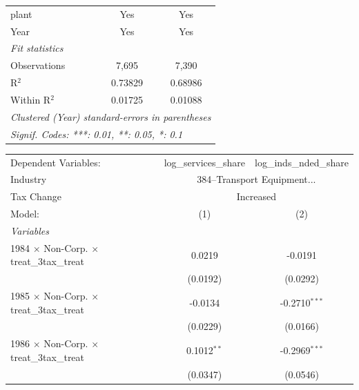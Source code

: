 \documentclass[
  12pt]{article}
\theoremstyle{definition}
\theoremstyle{remark}
\begin{document}
\begin{table}
\begin{minipage}{\linewidth}
\begin{tabular}{lcc}
   plant                                                   & Yes                    & Yes\\  
   Year                                                    & Yes                    & Yes\\  
   \midrule
   \emph{Fit statistics}\\
   Observations                                            & 7,695                  & 7,390\\  
   R$^2$                                                   & 0.73829                & 0.68986\\  
   Within R$^2$                                            & 0.01725                & 0.01088\\  
   \midrule \midrule
   \multicolumn{3}{l}{\emph{Clustered (Year) standard-errors in parentheses}}\\
   \multicolumn{3}{l}{\emph{Signif. Codes: ***: 0.01, **: 0.05, *: 0.1}}\\
\end{tabular}
\par\endgroup
\begingroup
\centering
\begin{tabular}{lcc}
   \tabularnewline \midrule \midrule
   Dependent Variables:                                    & log\_services\_share   & log\_inds\_nded\_share\\     
   Industry & \multicolumn{2}{c}{384–Transport Equipment...} \\ 
   Tax Change & \multicolumn{2}{c}{Increased} \\ 
   Model:                                                  & (1)                    & (2)\\  
   \midrule
   \emph{Variables}\\
   1984 $\times$ Non-Corp. $\times$ treat\_3tax\_treat     & 0.0219                 & -0.0191\\   
                                                           & (0.0192)               & (0.0292)\\   
   1985 $\times$ Non-Corp. $\times$ treat\_3tax\_treat     & -0.0134                & -0.2710$^{***}$\\   
                                                           & (0.0229)               & (0.0166)\\   
   1986 $\times$ Non-Corp. $\times$ treat\_3tax\_treat     & 0.1012$^{**}$          & -0.2969$^{***}$\\   
                                                           & (0.0347)               & (0.0546)\\   

\end{tabular}
\end{minipage}
\end{table}
\end{document}
